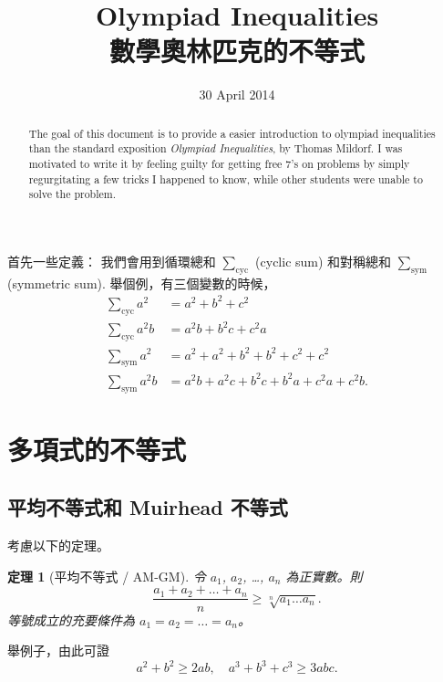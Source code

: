 \documentclass[11pt,nothm]{scrartcl}
\newtheorem{theorem}{\color{blue!40!black}定理}
\theoremstyle{definition}
\begin{document}
\title{Olympiad Inequalities \\ 數學奧林匹克的不等式}
\date{30 April 2014}
\maketitle

\begin{abstract}
  The goal of this document is to provide a easier introduction to olympiad inequalities than the standard exposition \emph{Olympiad Inequalities}, by Thomas Mildorf. I was motivated to write it by feeling guilty for getting free $7$'s on problems by simply regurgitating a few tricks I happened to know, while other students were unable to solve the problem.
\end{abstract}

首先一些定義： 我們會用到循環總和 $\sum_{\text{cyc}}$ (cyclic sum) 和對稱總和 $\sum_{\text{sym}}$ (symmetric sum).
舉個例，有三個變數的時候，
\begin{align*}
  \sum_{\text{cyc}} a^2 &= a^2+b^2+c^2 \\
  \sum_{\text{cyc}} a^2b &= a^2b+b^2c+c^2a \\
  \sum_{\text{sym}} a^2 &= a^2+a^2+b^2+b^2+c^2+c^2 \\
  \sum_{\text{sym}} a^2b &= a^2b+a^2c+b^2c+b^2a+c^2a+c^2b.
\end{align*}

\section{多項式的不等式}
\subsection{平均不等式和 Muirhead 不等式}
考慮以下的定理。
\begin{theorem}
  [平均不等式 / AM-GM] 令 $a_1$, $a_2$, \dots, $a_n$ 為正實數。則
  \[ \frac{a_1 + a_2 + \dots + a_n}{n} \ge \sqrt[n]{a_1 \dots a_n}. \]
  等號成立的充要條件為 $a_1 = a_2 = \dots = a_n$。
\end{theorem}
舉例子，由此可證 \[ a^2+b^2 \ge 2ab, \quad a^3+b^3+c^3 \ge 3abc. \]
\end{document}
